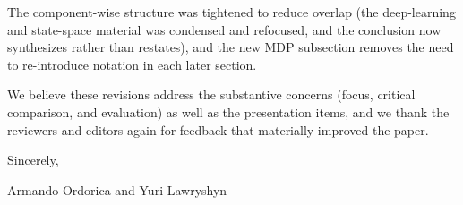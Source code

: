 \documentclass[11pt]{article}
\begin{document}
The component-wise structure was tightened to reduce overlap (the deep-learning
and state-space material was condensed and refocused, and the conclusion now
synthesizes rather than restates), and the new MDP subsection removes the need
to re-introduce notation in each later section.

\bigskip

\noindent We believe these revisions address the substantive concerns (focus,
critical comparison, and evaluation) as well as the presentation items, and we
thank the reviewers and editors again for feedback that materially improved the
paper.

\bigskip

\noindent Sincerely,

\medskip

\noindent Armando Ordorica and Yuri Lawryshyn
\end{document}

